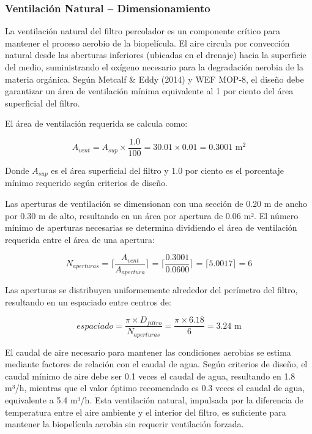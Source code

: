 \documentclass[12pt,a4paper]{article}
\begin{document}
\subsubsection{Ventilación Natural -- Dimensionamiento}

La ventilación natural del filtro percolador es un componente crítico para mantener el proceso aerobio de la biopelícula. El aire circula por convección natural desde las aberturas inferiores (ubicadas en el drenaje) hacia la superficie del medio, suministrando el oxígeno necesario para la degradación aerobia de la materia orgánica. Según Metcalf \& Eddy (2014) y WEF MOP-8, el diseño debe garantizar un área de ventilación mínima equivalente al 1 por ciento del área superficial del filtro.

El área de ventilación requerida se calcula como:

\begin{equation}
A_{vent} = A_{sup} \times \frac{1.0}{100} = 30.01 \times 0.01 = 0.3001 \text{ m}^2
\end{equation}

Donde $A_{sup}$ es el área superficial del filtro y 1.0 por ciento es el porcentaje mínimo requerido según criterios de diseño.

Las aperturas de ventilación se dimensionan con una sección de 0.20 m de ancho por 0.30 m de alto, resultando en un área por apertura de 0.06 m². El número mínimo de aperturas necesarias se determina dividiendo el área de ventilación requerida entre el área de una apertura:

\begin{equation}
N_{aperturas} = \lceil\frac{A_{vent}}{A_{apertura}}\rceil = \lceil\frac{0.3001}{0.0600}\rceil = \lceil5.0017\rceil = 6
\end{equation}

Las aperturas se distribuyen uniformemente alrededor del perímetro del filtro, resultando en un espaciado entre centros de:

\begin{equation}
espaciado = \frac{\pi \times D_{filtro}}{N_{aperturas}} = \frac{\pi \times 6.18}{6} = 3.24 \text{ m}
\end{equation}

El caudal de aire necesario para mantener las condiciones aerobias se estima mediante factores de relación con el caudal de agua. Según criterios de diseño, el caudal mínimo de aire debe ser 0.1 veces el caudal de agua, resultando en 1.8 m³/h, mientras que el valor óptimo recomendado es 0.3 veces el caudal de agua, equivalente a 5.4 m³/h. Esta ventilación natural, impulsada por la diferencia de temperatura entre el aire ambiente y el interior del filtro, es suficiente para mantener la biopelícula aerobia sin requerir ventilación forzada.
\end{document}
